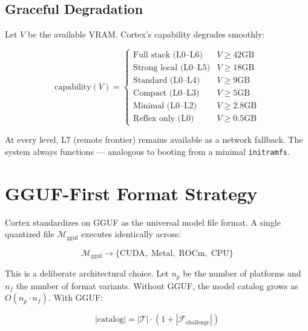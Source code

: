 \documentclass[11pt, a4paper, twocolumn]{article}
\newcommand{\family}{\mathcal{F}}
\newcommand{\model}{\mathcal{M}}
\begin{document}
\subsection{Graceful Degradation}

Let $V$ be the available VRAM. Cortex's capability degrades smoothly:

\begin{equation}
    \text{capability}(V) = 
    \begin{cases}
        \text{Full stack (L0--L6)} & V \geq 42\text{GB} \\
        \text{Strong local (L0--L5)} & V \geq 18\text{GB} \\
        \text{Standard (L0--L4)} & V \geq 9\text{GB} \\
        \text{Compact (L0--L3)} & V \geq 5\text{GB} \\
        \text{Minimal (L0--L2)} & V \geq 2.8\text{GB} \\
        \text{Reflex only (L0)} & V \geq 0.5\text{GB}
    \end{cases}
\end{equation}

At every level, L7 (remote frontier) remains available as a network fallback. The system always functions --- analogous to booting from a minimal \texttt{initramfs}.

\section{GGUF-First Format Strategy}

Cortex standardizes on GGUF as the universal model file format. A single quantized file $\model_{\text{gguf}}$ executes identically across:

\begin{equation}
    \model_{\text{gguf}} \to \{\text{CUDA},\; \text{Metal},\; \text{ROCm},\; \text{CPU}\}
\end{equation}

This is a deliberate architectural choice. Let $n_p$ be the number of platforms and $n_f$ the number of format variants. Without GGUF, the model catalog grows as $O(n_p \cdot n_f)$. With GGUF:

\begin{equation}
    |\text{catalog}| = |\mathcal{T}| \cdot (1 + |\family_{\text{challenge}}|)
\end{equation}
\end{document}

